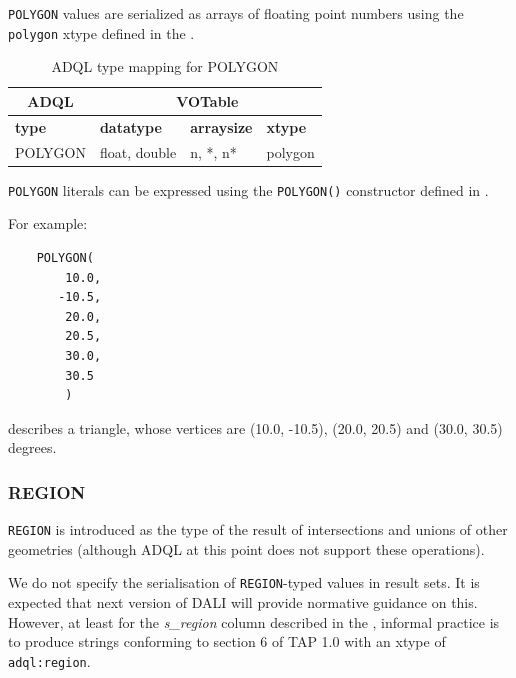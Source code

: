 \documentclass[11pt,a4paper]{ivoa}
\begin{document}
\verb:POLYGON: values are serialized as arrays of floating point numbers
using the \verb:polygon: xtype defined in the \DALISpec{}.

\begin{table}[th]\footnotesize
    \begin{tabular}
        {|p{}|p{}|p{}|p{}|}
        
        \hline
        \multicolumn{1}{|c|}{\textbf{ADQL}} &
        \multicolumn{3}{|c|}{\textbf{VOTable}}
        \tabularnewline
        
        \hline
        \textbf{type} &
        \textbf{datatype} &
        \textbf{arraysize} &
        \textbf{xtype}
        \tabularnewline

        \hline
        POLYGON &
        float, double &
        n, *, n* &
        polygon
        \tabularnewline
        \hline
    \end{tabular}
    \caption{ADQL type mapping for POLYGON}
    \label{table:types.geom.polygon}
\end{table}

\verb:POLYGON: literals can be expressed using the \verb:POLYGON():
constructor defined in .

For example:
\begin{verbatim}
    POLYGON(
        10.0,
       -10.5,
        20.0,
        20.5,
        30.0,
        30.5
        )
\end{verbatim}
\noindent
describes a triangle, whose vertices are (10.0, -10.5), (20.0, 20.5)
and (30.0, 30.5) degrees.

\subsubsection{REGION}
\label{sec:types.geom.region}

\verb:REGION: is introduced as the type of the result of intersections and
unions of other geometries (although ADQL at this point does not support
these operations).

We do not specify the serialisation of \verb:REGION:-typed values in result
sets.  It is expected that next version of DALI will provide normative
guidance on this. However, at least for the \textit{s\_region}
column described in the \ObsCoreSpec{},
informal practice is to produce strings conforming to section 6
of TAP 1.0 \citep{2010ivoa.spec.0327D} with an xtype of
\texttt{adql:region}.
\end{document}
